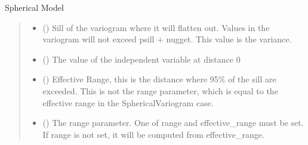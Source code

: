 \documentclass[letterpaper,10pt,english]{sphinxmanual}
\begin{document}

\begin{fulllineitems}
\label{\detokenize{covariance:glomar_gridding.variogram.SphericalVariogram}}
\pysigstartsignatures
\pysiglinewithargsret
{}
{\sphinxparamcomma {}\sphinxparamcomma {}\sphinxparamcomma {}}
{}
\pysigstopsignatures
\sphinxAtStartPar
Spherical Model
\begin{quote}\begin{description}
\begin{itemize}
\item {}
\sphinxAtStartPar
{} () \textendash{} Sill of the variogram where it will flatten out. Values in the variogram
will not exceed psill + nugget. This value is the variance.

\item {}
\sphinxAtStartPar
{} () \textendash{} The value of the independent variable at distance 0

\item {}
\sphinxAtStartPar
{} () \textendash{} Effective Range, this is the distance where 95\% of the sill are
exceeded. This is not the range parameter, which is equal to the
effective range in the SphericalVariogram case.

\item {}
\sphinxAtStartPar
{} () \textendash{} The range parameter. One of range and effective\_range must be set. If
range is not set, it will be computed from effective\_range.


\end{itemize}
\end{description}
\end{quote}
\end{fulllineitems}
\end{document}
